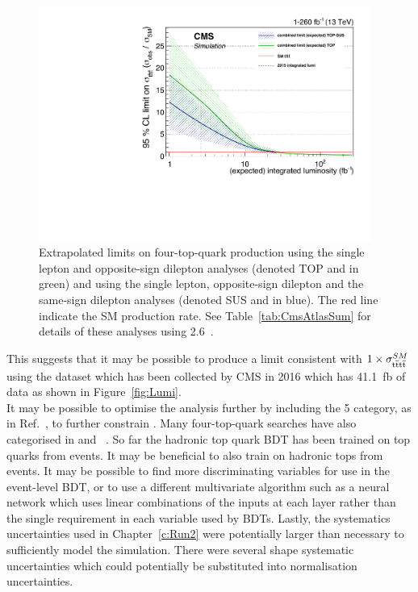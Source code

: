 \begin{figure}[ht!]
\begin{center}
    \includegraphics[width=0.97\textwidth]{images/Conclusion/combined_limitvslumi.pdf}
    \caption{Extrapolated limits on four-top-quark production using the single lepton and opposite-sign dilepton analyses (denoted TOP and in green) and using the single lepton, opposite-sign dilepton and the same-sign dilepton analyses (denoted SUS and in blue). The red line indicate the SM production rate. See Table~\ref{tab:CmsAtlasSum} for details of these analyses using 2.6~\fbinv.}
    \label{fig:ttbarXstairway}
\end{center}
\end{figure}

This suggests that it may be possible to produce a limit consistent with $1 \times \sigma_{{\mathrm{t}\overline{\mathrm{t}}\mathrm{t}\overline{\mathrm{t}}}}^{SM} $ using the dataset which has been collected by CMS in 2016 which has 41.1~fb of data as shown in Figure~\ref{fig:Lumi}.\\

It may be possible to optimise the analysis further by including the 5 \njets category, as in Ref.~\cite{ATLAS-CONF-2016-020}, to further constrain \ttbar. Many four-top-quark searches have also categorised in \HT and \MET~\cite{ATLAS-CONF-2016-020,Chatrchyan:2013fea}. So far the hadronic top quark BDT has been trained on top quarks from \ttbar events. It may be beneficial to also train on hadronic tops from \tttt events. It may be possible to find more discriminating variables for use in the event-level BDT, or to use a different multivariate algorithm such as a neural network which uses linear combinations of the inputs at each layer rather than the single requirement in each variable used by BDTs. Lastly, the systematics uncertainties used in Chapter~\ref{c:Run2} were potentially larger than necessary to sufficiently model the simulation. There were several shape systematic uncertainties which could potentially be substituted into normalisation uncertainties. 

